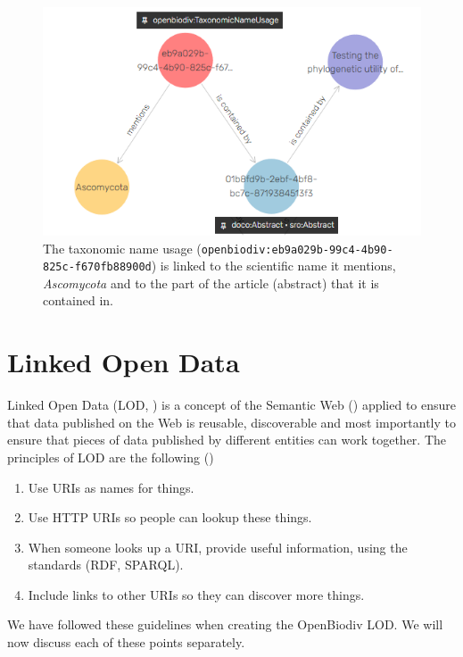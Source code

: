 \begin{figure}
\centering
\includegraphics[width=\textwidth]{Figures/tnu-vis}
\decoRule
\caption[Visual graph of a taxonomic name usage]{The taxonomic name usage ({\tt openbiodiv:eb9a029b-99c4-4b90-825c-f670fb88900d}) is linked to the scientific name it mentions, \emph{Ascomycota} and to the part of the article (abstract) that it is contained in.}
\label{fig:tnu-vis}
\end{figure}

\section{Linked Open Data}

Linked Open Data (LOD, \cite{heath_linked_2011}) is a concept of the Semantic Web (\cite{berners-lee_semantic_2001}) applied to ensure that data published on the Web is reusable, discoverable and most importantly to ensure that pieces of data published by different entities can work together. The principles of LOD are the following (\cite{heath_linked_2011})

\begin{enumerate}
\item{Use URIs as names for things.}
\item{Use HTTP URIs so people can lookup these things.}
\item{When someone looks up a URI, provide useful information, using the standards (RDF, SPARQL).}
\item{Include links to other URIs so they can discover more things.}
\end{enumerate}

We have followed these guidelines when creating the OpenBiodiv LOD. We will now discuss each of these points separately.

